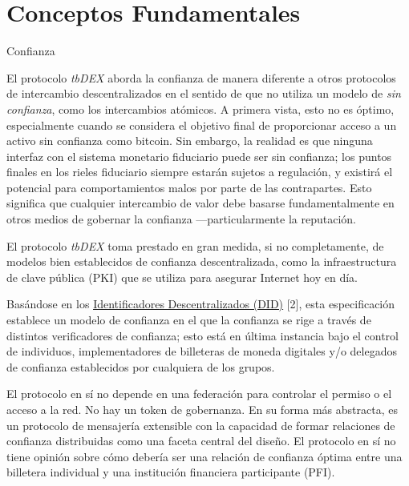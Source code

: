 \documentclass[11pt]{article}
\begin{document}
\section{Conceptos Fundamentales}

\vspace{1\baselineskip}
{\LARGE Confianza}

\vspace{1\baselineskip}
El protocolo \textit{tbDEX} aborda la confianza de manera diferente a otros protocolos de intercambio descentralizados en el sentido de que no utiliza un modelo de \textit{sin confianza}, como los intercambios atómicos. A primera vista, esto no es óptimo, especialmente cuando se considera el objetivo final de proporcionar acceso a un activo sin confianza como bitcoin. Sin embargo, la realidad es que ninguna interfaz con el sistema monetario fiduciario puede ser sin confianza; los puntos finales en los rieles fiduciario siempre estarán sujetos a regulación, y existirá el potencial para comportamientos malos por parte de las contrapartes. Esto significa que cualquier intercambio de valor debe basarse fundamentalmente en otros medios de gobernar la confianza \textcolor[HTML]{202124}{—}particularmente la reputación. 

\vspace{1\baselineskip}
El protocolo \textit{tbDEX} toma prestado en gran medida, si no completamente, de modelos bien establecidos de confianza descentralizada, como la infraestructura de clave pública (PKI) que se utiliza para asegurar Internet hoy en día. 

\vspace{1\baselineskip}
Basándose en los \href{https://www.w3.org/TR/did-core}{\uline{\textcolor[HTML]{1155CC}{Identificadores Descentralizados (DID)}}} [2], esta especificación establece un modelo de confianza en el que la confianza se rige a través de distintos verificadores de confianza; esto está en última instancia bajo el control de individuos, implementadores de billeteras de moneda digitales y/o delegados de confianza establecidos por cualquiera de los grupos. 

\vspace{1\baselineskip}
El protocolo en sí no depende en una federación para controlar el permiso o el acceso a la red. No hay un token de gobernanza. En su forma más abstracta, es un protocolo de mensajería extensible con la capacidad de formar relaciones de confianza distribuidas como una faceta central del diseño. El protocolo en sí no tiene opinión sobre cómo debería ser una relación de confianza óptima entre una billetera individual y una institución financiera participante (PFI). 
\end{document}
